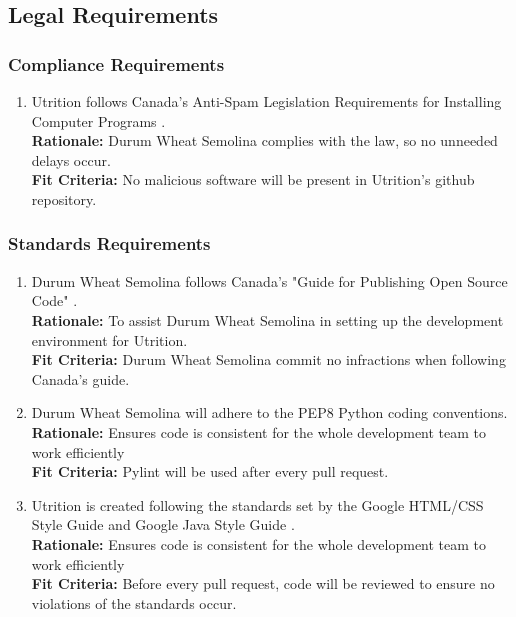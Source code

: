 \documentclass[12pt]{article}
\begin{document}
\subsection{Legal Requirements}
\subsubsection{Compliance Requirements}
\begin{enumerate}[{LR}1. ]
	\item Utrition follows Canada’s Anti-Spam Legislation Requirements for Installing Computer Programs \citep{CanadianInstall}.\\
	\textbf{Rationale:} Durum Wheat Semolina complies with the law, so no unneeded delays occur.\\
	\textbf{Fit Criteria:} No malicious software will be present in Utrition’s github repository.
\end{enumerate}
\subsubsection{Standards Requirements}
\begin{enumerate}[start=2,label={LR\arabic*.}]
	\item Durum Wheat Semolina follows Canada's "Guide for Publishing Open Source 
	Code" \citep{CanadianCode}.\\
	\textbf{Rationale:} To assist Durum Wheat Semolina in setting up the development environment for Utrition.\\
	\textbf{Fit Criteria:} Durum Wheat Semolina commit no infractions when following Canada’s guide.
	\item Durum Wheat Semolina will adhere to the PEP8 Python coding conventions.\\
	\textbf{Rationale:} Ensures code is consistent for the whole development team to work efficiently \\
	\textbf{Fit Criteria:} Pylint will be used after every pull request.
	\item Utrition is created following the standards set by the Google HTML/CSS Style Guide \citep{HTMLCSSStyle} and Google Java Style Guide \citep{JavaStyle}. \\
	\textbf{Rationale:} Ensures code is consistent for the whole development team to work efficiently \\
	\textbf{Fit Criteria:} Before every pull request, code will be reviewed to ensure no violations of the standards occur.
\end{enumerate}
\end{document}

